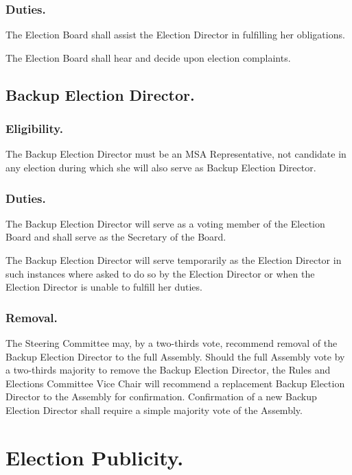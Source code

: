 \subsubsection{Duties.}

\subsubsubsection{}
The Election Board shall assist the Election Director in fulfilling her obligations.

\subsubsubsection{}
The Election Board shall hear and decide upon election complaints.

\subsection{Backup Election Director.}

\subsubsection{Eligibility.} The Backup Election Director must be an MSA Representative, not candidate in any election during which she will also serve as Backup Election Director.

\subsubsection{Duties.}

\subsubsubsection{}
The Backup Election Director will serve as a voting member of the Election Board and shall serve as the Secretary of the Board.

\subsubsubsection{}
The Backup Election Director will serve temporarily as the Election Director in such instances where asked to do so by the Election Director or when the Election Director is unable to fulfill her duties.

\subsubsection{Removal.}
The Steering Committee may, by a two-thirds vote, recommend removal of the Backup Election Director to the full Assembly. Should the full Assembly vote by a two-thirds majority to remove the Backup Election Director, the Rules and Elections Committee Vice Chair will recommend a replacement Backup Election Director to the Assembly for confirmation. Confirmation of a new Backup Election Director shall require a simple majority vote of the Assembly.


\section{Election Publicity.}

